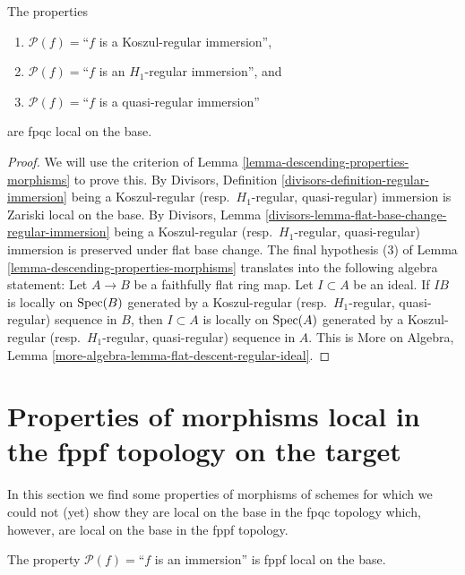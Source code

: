 \begin{lemma}
\label{lemma-descending-property-regular-immersion}
The properties
\begin{enumerate}
\item[] $\mathcal{P}(f) =$``$f$ is a Koszul-regular immersion'',
\item[] $\mathcal{P}(f) =$``$f$ is an $H_1$-regular immersion'', and
\item[] $\mathcal{P}(f) =$``$f$ is a quasi-regular immersion''
\end{enumerate}
are fpqc local on the base.
\end{lemma}

\begin{proof}
We will use the criterion of
Lemma \ref{lemma-descending-properties-morphisms}
to prove this. By
Divisors, Definition \ref{divisors-definition-regular-immersion}
being a Koszul-regular (resp.\ $H_1$-regular, quasi-regular)
immersion is Zariski local on the base. By
Divisors, Lemma \ref{divisors-lemma-flat-base-change-regular-immersion}
being a Koszul-regular (resp.\ $H_1$-regular, quasi-regular)
immersion is preserved under flat base change.
The final hypothesis (3) of
Lemma \ref{lemma-descending-properties-morphisms}
translates into the following algebra statement:
Let $A \to B$ be a faithfully flat ring map. Let $I \subset A$ be an ideal.
If $IB$ is locally on $\mathop{\mathrm{Spec}}(B)$ generated by a Koszul-regular
(resp.\ $H_1$-regular, quasi-regular) sequence in $B$, then $I \subset A$
is locally on $\mathop{\mathrm{Spec}}(A)$ generated by a Koszul-regular
(resp.\ $H_1$-regular, quasi-regular) sequence in $A$. This is
More on Algebra, Lemma \ref{more-algebra-lemma-flat-descent-regular-ideal}.
\end{proof}





\section{Properties of morphisms local in the fppf topology on the target}
\label{section-descending-properties-morphisms-fppf}

\noindent
In this section we find some properties of morphisms of schemes
for which we could not (yet) show they are local on the base in
the fpqc topology which, however, are local on the base
in the fppf topology.

\begin{lemma}
\label{lemma-descending-fppf-property-immersion}
The property $\mathcal{P}(f) =$``$f$ is an immersion''
is fppf local on the base.
\end{lemma}

